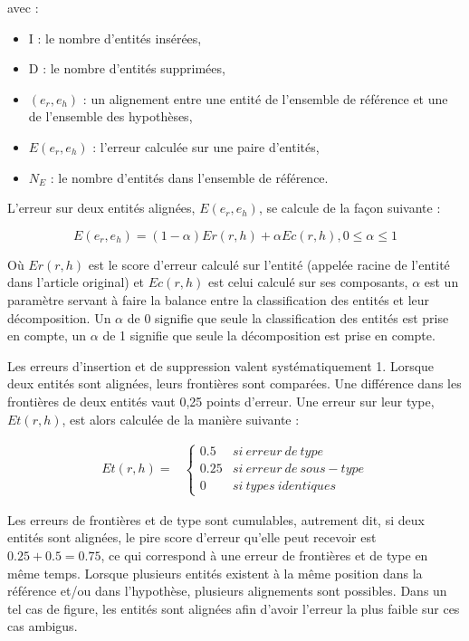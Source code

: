\documentclass[12pt,a4paper,times,twoside,openright]{report}
\begin{document}
avec :
\begin{itemize}
    \item I : le nombre d'entités insérées,
    \item D : le nombre d'entités supprimées,
    \item $(e_{r}, e_{h})$ : un alignement entre une entité de l'ensemble de référence et une de l'ensemble des hypothèses,
    \item $E(e_{r}, e_{h})$ : l'erreur calculée sur une paire d'entités,
    \item $N_{E}$ : le nombre d'entités dans l'ensemble de référence.
\end{itemize}

L'erreur sur deux entités alignées, $E(e_{r}, e_{h})$, se calcule de la façon suivante :

\begin{equation}\label{eq:eter-global-entity-error}
E(e_{r}, e_{h}) = (1-\alpha)Er(r,h) + \alpha Ec(r,h), 0 \leq \alpha \leq 1
\end{equation}

Où $Er(r,h)$ est le score d'erreur calculé sur l'entité (appelée racine de l'entité dans l'article original) et $Ec(r,h)$ est celui calculé sur ses composants, $\alpha$ est un paramètre servant à faire la balance entre la classification des entités et leur décomposition. Un $\alpha$ de 0 signifie que seule la classification des entités est prise en compte, un $\alpha$ de 1 signifie que seule la décomposition est prise en compte.

Les erreurs d'insertion et de suppression valent systématiquement 1. Lorsque deux entités sont alignées, leurs frontières sont comparées. Une différence dans les frontières de deux entités vaut 0,25 points d'erreur. Une erreur sur leur type, $Et(r,h)$, est alors calculée de la manière suivante :

\begin{equation}\label{eq:ETER-entity-error}
\begin{aligned}
Et(r,h) = & \left\{ \begin{array}{ll}
            0.5  & si\ erreur\ de\ type \\
            0.25 & si\ erreur\ de\ sous-type\\
            0    & si\ types\ identiques
            \end{array} \right.
\end{aligned}
\end{equation}

Les erreurs de frontières et de type sont cumulables, autrement dit, si deux entités sont alignées, le pire score d'erreur qu'elle peut recevoir est $0.25 + 0.5 = 0.75$, ce qui correspond à une erreur de frontières et de type en même temps. Lorsque plusieurs entités existent à la même position dans la référence et/ou dans l'hypothèse, plusieurs alignements sont possibles. Dans un tel cas de figure, les entités sont alignées afin d'avoir l'erreur la plus faible sur ces cas ambigus.
\end{document}
